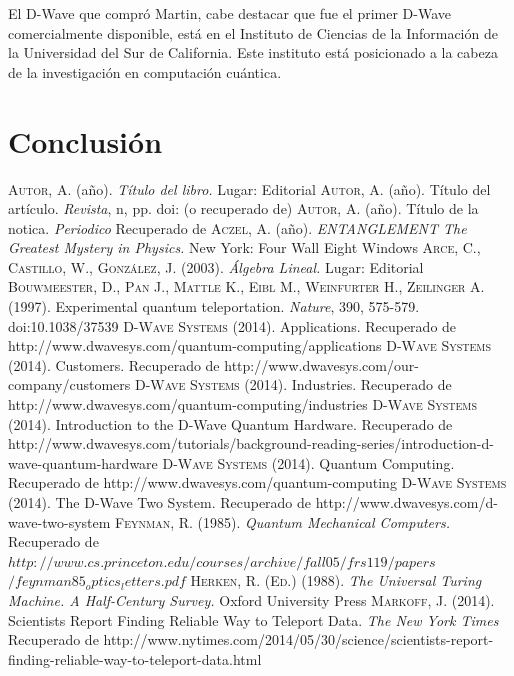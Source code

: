 \documentclass[11pt,a4paper]{article}
\begin{document}
El D-Wave que compró Martin, cabe destacar que fue el primer D-Wave comercialmente disponible, está en el Instituto de Ciencias de la Información de la Universidad del Sur de California. Este instituto está posicionado a la cabeza de la investigación en computación cuántica.

\part*{Conclusión}


\clearpage
\begin{thebibliography}{X}
 \textsc{Autor, A.} (año). \textit{Título del libro.} Lugar: Editorial
 \textsc{Autor, A.} (año). Título del artículo. \textit{Revista}, n, pp. doi: (o recuperado de)
 \textsc{Autor, A.} (año). Título de la notica. \textit{Periodico} Recuperado de
 \textsc{Aczel, A.} (año). \textit{ENTANGLEMENT The Greatest Mystery in Physics.} New York: Four Wall Eight Windows
 \textsc{Arce, C., Castillo, W., González, J.} (2003). \textit{Álgebra Lineal.} Lugar: Editorial
 \textsc{Bouwmeester, D., Pan J., Mattle K., Eibl M., Weinfurter H., Zeilinger A.} (1997). Experimental quantum teleportation. \textit{Nature}, 390, 575-579. doi:10.1038/37539
 \textsc{D-Wave Systems} (2014). Applications. Recuperado de http://www.dwavesys.com/quantum-computing/applications
 \textsc{D-Wave Systems} (2014). Customers. Recuperado de http://www.dwavesys.com/our-company/customers
 \textsc{D-Wave Systems} (2014). Industries. Recuperado de http://www.dwavesys.com/quantum-computing/industries
 \textsc{D-Wave Systems} (2014). Introduction to the D-Wave Quantum Hardware. Recuperado de http://www.dwavesys.com/tutorials/background-reading-series/introduction-d-wave-quantum-hardware
 \textsc{D-Wave Systems} (2014). Quantum Computing. Recuperado de http://www.dwavesys.com/quantum-computing
 \textsc{D-Wave Systems} (2014). The D-Wave Two System. Recuperado de http://www.dwavesys.com/d-wave-two-system
 \textsc{Feynman, R.} (1985). \textit{Quantum Mechanical Computers.} Recuperado de $http://www.cs.princeton.edu/courses/archive/fall05/frs119/papers$
$/feynman85_optics_letters.pdf$
 \textsc{Herken, R. (Ed.)} (1988). \textit{The Universal Turing Machine. A Half-Century Survey.} Oxford University Press
 \textsc{Markoff, J.} (2014). Scientists Report Finding Reliable Way to Teleport Data. \textit{The New York Times} Recuperado de http://www.nytimes.com/2014/05/30/science/scientists-report-finding-reliable-way-to-teleport-data.html

\end{thebibliography}
\end{document}
